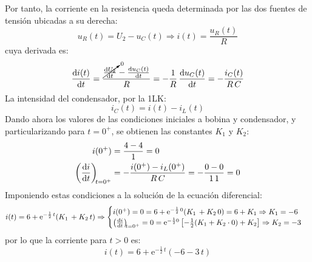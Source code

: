 \documentclass[11pt]{book} %
\begin{document}
\begin{example}
	    Por tanto, la corriente en la resistencia queda determinada por las dos fuentes de tensión ubicadas a su derecha:
	    \begin{equation*}
	        u_R(t)=U_2-u_C(t)\Rightarrow i(t)=\dfrac{u_R(t)}{R}
	    \end{equation*}
	    cuya derivada es: 
	    \begin{equation*}
	        \diff{i(t)}{t}=\dfrac{\cancelto{0}{\diff{U_2}{t}}-\diff{u_C(t)}{t}}{R}=-\dfrac{1}{R}\,\diff{u_C(t)}{t}=-\dfrac{i_C(t)}{R\,C}
	    \end{equation*}
	    La intensidad del condensador, por la 1LK:
	    \begin{equation*}
	        i_C(t)=i(t)-i_L(t)
	    \end{equation*}
	    Dando ahora los valores de las condiciones iniciales a bobina y condensador, y particularizando para $t=0^+$, se obtienen las constantes $K_1$ y $K_2$:
	    \begin{align*}
	        i(0^+)&=\dfrac{4-4}{1}=0\\
	        \diff{i}{t}[t = 0^+]&=-\dfrac{i(0^+)-i_L(0^+)}{R\,C}=-\dfrac{0-0}{1\,1}=0
	    \end{align*}
	    Imponiendo estas condiciones a la solución de la ecuación diferencial:
	    \begin{equation*}
	        i(t)=6+\mathrm{e}^{-\frac{1}{2}\,t}(K_1\,+K_2\,t)\Rightarrow
	        \begin{cases}
	            i(0^+)=0=6+\mathrm{e}^{-\frac{1}{2}\,0}(K_1\,+K_2\,0)=6+K_1\Rightarrow K_1=-6\\
	            \diff{i}{t}[t = 0^+]=0=\mathrm{e}^{-\frac{1}{2}0}\left[-\frac{1}{2}(K_1+K_2\cdot 0)+K_2 \right]\Rightarrow K_2=-3
	        \end{cases}
	    \end{equation*}
	    por lo que la corriente para $t>0$ es:
	    \begin{equation*}
	        i(t)=6+\mathrm{e}^{-\frac{1}{2}\,t}(-6-3\,t)
	    \end{equation*}
	    
	\end{example}
	
 
\end{document}
